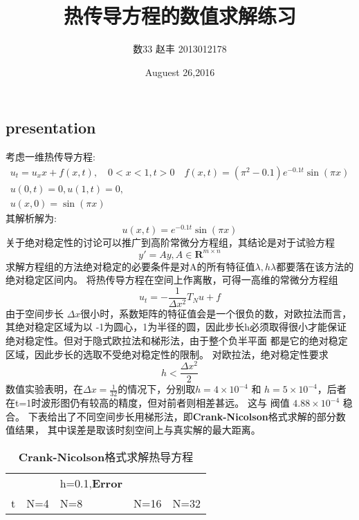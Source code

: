 \documentclass[10pt]{article}
\begin{document}
\begin{CJK}{GBK}{song}
\title{热传导方程的数值求解练习} %
\author{数33 赵丰 2013012178}
\date{Auguest 26,2016}
\maketitle
\section{presentation}
\setlength{\parindent}{2em}
考虑一维热传导方程:
\begin{gather*}
  u_t=u_xx+f(x,t),\quad 0<x<1,t>0 \quad f(x,t)=(\pi^2-0.1)e^{-0.1t}\sin(\pi x) \\
  u(0,t)=0,u(1,t)=0,  \\
  u(x,0)=\sin(\pi x)
\end{gather*}
其解析解为:
$$ u(x,t)=e^{-0.1t}\sin(\pi x) $$
关于绝对稳定性的讨论可以推广到高阶常微分方程组，其结论是对于试验方程
$$ y'=Ay,A\in \bm{R}^{m\times n}$$
求解方程组的方法绝对稳定的必要条件是对A的所有特征值$\lambda,h\lambda$都要落在该方法的绝对稳定区间内。
将热传导方程在空间上作离散，可得一高维的常微分方程组
$$ u_t=-\frac{1}{\Delta x^2}T_N u +f $$
由于空间步长 $\Delta x$很小时，系数矩阵的特征值会是一个很负的数，对欧拉法而言，其绝对稳定区域为以
-1为圆心，1为半径的圆，因此步长h必须取得很小才能保证绝对稳定性。但对于隐式欧拉法和梯形法，由于整个负半平面
都是它的绝对稳定区域，因此步长的选取不受绝对稳定性的限制。
对欧拉法，绝对稳定性要求
$$ h<\frac{\Delta x^2}{2} $$
数值实验表明，在$\Delta x=\frac{1}{32}$的情况下，分别取$h=4\times 10^{-4}$ 和
$h=5\times 10^{-4}$，后者在t=1时波形图仍有较高的精度，但对前者则相差甚远。
这与 阀值 $ 4.88 \times 10^{-4} $ 稳合。
下表给出了不同空间步长用梯形法，即\textbf{Crank-Nicolson}格式求解的部分数值结果，
其中误差是取该时刻空间上与真实解的最大距离。
\begin{table}[!ht]
\centering
\caption{\textbf{Crank-Nicolson}格式求解热导方程}
\begin{tabular}{lllll}
\toprule[1.5pt]
  & & h=0.1,\textbf{Error} & & \\
\cmidrule(r){1-1} \cmidrule(l){2-5}
t & N=4&N=8&N=16&N=32\\

\end{tabular}
\end{table}
\end{CJK}
\end{document}
